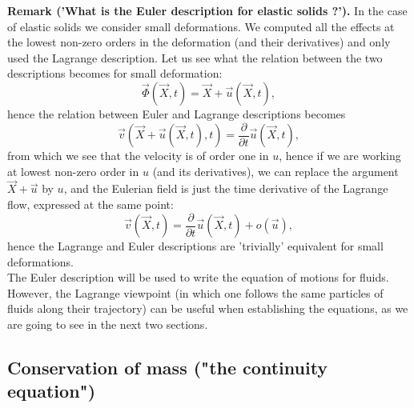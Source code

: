 \documentclass[DIV=12]{article}
\begin{document}
{\bf{Remark ('What is the Euler description for elastic solids ?').}} In the case of elastic solids
 we consider small deformations. We computed all the effects at the lowest non-zero orders
 in the deformation (and their derivatives) and only used the Lagrange description. Let us see 
 what the relation between the two descriptions becomes for small deformation:\\
\begin{equation}
\vec{\Phi}(\vec{X},t) = \vec{X} + \vec{u}(\vec{X},t),
\end{equation}
 hence the relation between Euler and Lagrange descriptions becomes
\begin{equation}
\vec{v}(  \vec{X} + \vec{u}(\vec{X},t) ,t) =  \frac{\partial}{\partial t}\vec{u}(\vec{X},t),
\end{equation}
 from which we see that the velocity is of order one in $u$, hence if we are working at 
lowest non-zero order in $u$ (and its derivatives), we can replace the argument  $\vec{X} + \vec{u}$ by $u$,
 and the Eulerian field is just the time derivative of the Lagrange flow, expressed at the same point:
\begin{equation}
\vec{v}(  \vec{X},t) =  \frac{\partial}{\partial t}\vec{u}(\vec{X},t) + o(\vec{u}),
\label{solidCase}
\end{equation}
 hence the Lagrange and Euler descriptions are 'trivially' equivalent for small deformations.\\

The Euler description will be used to write the equation 
 of motions for fluids. However, the Lagrange viewpoint (in which one follows the 
 same particles of fluids along their trajectory) 
 can be useful when establishing  the equations, as we are going 
 to see in the next two sections.

\subsection{Conservation of mass ("the continuity equation")}
\end{document}
